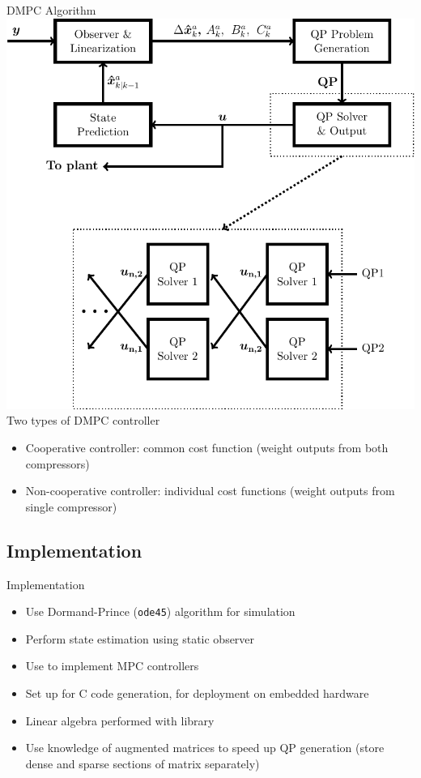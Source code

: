 \begin{frame}{DMPC Algorithm}
    \centering
    \includegraphics[width=.6\linewidth]{figures/algorithm.pdf}
    Two types of DMPC controller
      \begin{itemize}
        \item Cooperative controller: common cost function (weight outputs from both compressors)
        \item Non-cooperative controller: individual cost functions (weight outputs from single compressor)
      \end{itemize}
\end{frame}


\subsection{Implementation}
\begin{frame}{Implementation}
  \begin{itemize}
    \item Use Dormand-Prince (\texttt{ode45}) algorithm for simulation
     \item Perform state estimation using static observer
  \end{itemize}

  \begin{itemize}
    \item Use \emlab{} to implement MPC controllers
    \item Set up for C code generation, for deployment on embedded hardware
  \end{itemize}

  \structure{\cpp{}}
  \begin{itemize}
    \item Linear algebra performed with \eigen{} library
    \item Use knowledge of augmented matrices to speed up QP generation (store dense and sparse sections of matrix separately)
  \end{itemize}

\end{frame}

